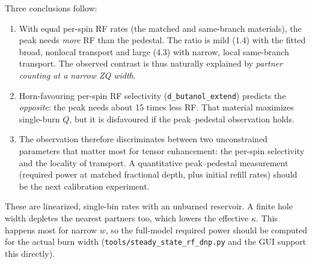 \documentclass[11pt]{article}
\newcommand{\code}[1]{\texttt{#1}}
\begin{document}
Three conclusions follow:
\begin{enumerate}
  \item With equal per-spin RF rates (the matched and same-branch materials), the peak needs
  \emph{more} RF than the pedestal. The ratio is mild (1.4) with the fitted broad, nonlocal
  transport and large (4.3) with narrow, local same-branch transport. The observed contrast is
  thus naturally explained by \emph{partner counting at a narrow ZQ width}.
  \item Horn-favouring per-spin RF selectivity (\code{d\_butanol\_extend}) predicts the
  \emph{opposite}: the peak needs about 15 times less RF. That material maximizes single-burn
  \(Q\), but it is disfavoured if the peak--pedestal observation holds.
  \item The observation therefore discriminates between two unconstrained parameters that matter
  most for tensor enhancement: the per-spin selectivity and the locality of transport. A
  quantitative peak--pedestal measurement (required power at matched fractional depth, plus
  initial refill rates) should be the next calibration experiment.
\end{enumerate}
These are linearized, single-bin rates with an unburned reservoir. A finite hole width depletes
the nearest partners too, which lowers the effective \(\kappa\). This happens most for narrow
\(w\), so the full-model required power should be computed for the actual burn width
(\code{tools/steady\_state\_rf\_dnp.py} and the GUI support this directly).
\end{document}

